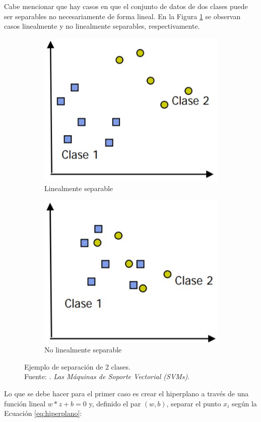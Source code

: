 \begin{itemize}
	Cabe mencionar que hay casos en que el conjunto de datos de dos clases puede ser separables no necesariamente de forma lineal. En la Figura \ref{2:fig37} se observan casos linealmente y no linealmente separables, respectivamente.
	\begin{figure}[!ht]
		\centering
		\small
		\begin{subfigure}{.5\textwidth}
			\centering
			\includegraphics[width=0.6\linewidth]{2/figures/caso1_svm.jpg}
			\caption{Linealmente separable}
		\end{subfigure}%
		\begin{subfigure}{.5\textwidth}
			\centering
			\includegraphics[width=0.6\linewidth]{2/figures/caso2_svm.jpg}
			\caption{No linealmente separable}
		\end{subfigure}
		\caption[Ejemplo de separación de 2 clases]{Ejemplo de separación de 2 clases.\\
		Fuente: \cite{tec_betancourt2005svm}. \textit{Las Máquinas de Soporte Vectorial (SVMs)}.}
		\label{2:fig37}
	\end{figure}
	
	
	Lo que se debe hacer para el primer caso es crear el hiperplano a través de una función lineal $w*z+b=0$ y, definido el par $(w,b)$, separar el punto $x_i$ según la Ecuación \ref{eq:hiperplano}:
	

\end{itemize}

